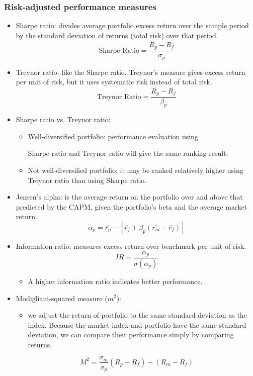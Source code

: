 \subsubsection{Risk-adjusted performance measures}
\begin{itemize}
\item Sharpe ratio: divides average portfolio excess return over the sample period by the standard deviation of returns (total risk) over that period.
\[
\text{Sharpe Ratio} = \frac{\overline{R_p} - \overline{R_f}}{\sigma_p}
\]
\item Treynor ratio: like the Sharpe ratio, Treynor's measure gives excess return per unit of risk, but it uses systematic risk instead of total risk.
\[
\text{Treynor Ratio} = \frac{\overline{R_p} - \overline{R_f}}{\beta_p}
\]
\item Sharpe ratio vs. Treynor ratio:
    \begin{itemize}
    \item Well-diversified portfolio: performance evaluation using 
    
    Sharpe ratio and Treynor ratio will give the same ranking result.
    \item Not well-diversified portfolio: it may be ranked relatively higher using Treynor ratio than using Sharpe ratio.
    \end{itemize}
\item Jensen's alpha: is the average return on the portfolio over and above that predicted by the CAPM, given the portfolio's beta and the average market return.
\[
\alpha_p = \overline{r_p} - \left[\overline{r_f} + \beta_p (\overline{r_m} - \overline{r_f})\right]
\]
\item Information ratio: measures excess return over benchmark per unit of risk.
\[
IR = \frac{\alpha_p}{\sigma(\alpha_p)}
\]
    \begin{itemize}
    \item A higher information ratio indicates better performance.
    \end{itemize}
    
\item Modigliani-squared measure ($m^2$):

    \begin{itemize}
    \item we adjust the return of portfolio to the same standard deviation as the index. Because the market index and portfolio have the same standard deviation, we can compare their performance simply by comparing returns.
    \end{itemize}
\[
M^2 = \frac{\sigma_m}{\sigma_p}(R_p - R_f) - (R_m - R_f)
\]


\end{itemize}

